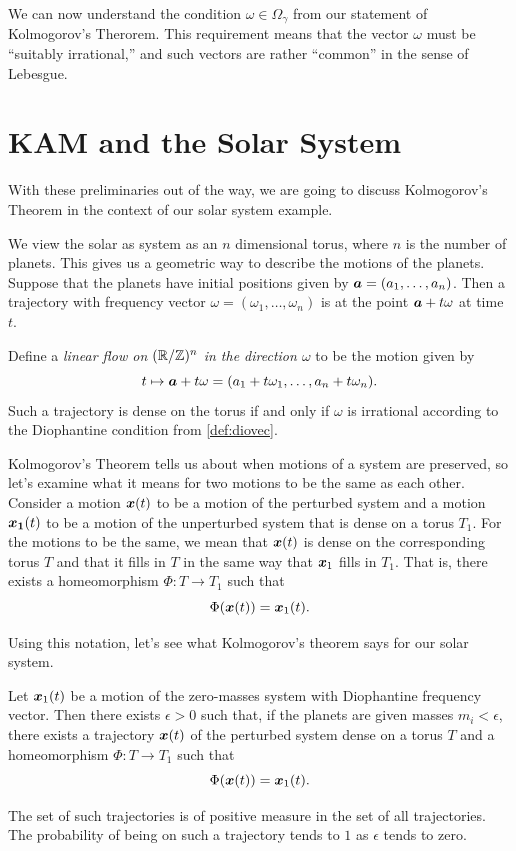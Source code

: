 \documentclass[twoside,letterpaper,11pt]{article}
\numberwithin{equation}{section}
\begin{document}
We can now understand the condition $\omega \in \Omega_{\gamma}$ from our
statement of Kolmogorov's Therorem.
This requirement means that the vector $\omega$ must be ``suitably irrational,''
and such vectors are rather ``common'' in the sense of Lebesgue.

\section{KAM and the Solar System}
\label{sec:kam-solar-system}

With these preliminaries out of the way, we are going to discuss Kolmogorov's
Theorem in the context of our solar system example.

We view the solar as system as an $n$ dimensional torus, where $n$ is the number
of planets.
This gives us a geometric way to describe the motions of the planets.
Suppose that the planets have initial positions given by $\bm{a} = (a_1, \ldots,
a_n)$.
Then a trajectory with frequency vector $\omega = (\omega_1, \ldots, \omega_n)$
is at the point $\bm{a} + t \omega$ at time $t$.

Define a \emph{linear flow on $(\mathbb{R}/\mathbb{Z})^n$ in the direction $\omega$} to be the
motion given by
\begin{equation*}
  t \mapsto \bm{a} + t \omega = (a_1 + t \omega_1, \ldots, a_n + t \omega_n).
\end{equation*}
Such a trajectory is dense on the torus if and only if $\omega$ is irrational
according to the Diophantine condition from \cref{def:diovec}.

Kolmogorov's Theorem tells us about when motions of a system are preserved, so
let's examine what it means for two motions to be the same as each other.
Consider a motion $\bm{x}(t)$ to be a motion of the perturbed system and a
motion $\bm{x_1}(t)$ to be a motion of the unperturbed system that is dense on a
torus $T_1$.
For the motions to be the same, we mean that $\bm{x}(t)$ is dense on the
corresponding torus $T$ and that it fills in $T$ in the same way that $\bm{x}_1$
fills in $T_1$.
That is, there exists a homeomorphism $\Phi : T \to T_1$ such that
\begin{equation*}
  \Phi(\bm{x}(t)) = \bm{x}_1(t).
\end{equation*}

Using this notation, let's see what Kolmogorov's theorem says for our solar
system.
\begin{thm}
  Let $\bm{x}_1(t)$ be a motion of the zero-masses system with Diophantine
  frequency vector.
  Then there exists $\epsilon > 0$ such that, if the planets are given masses
  $m_i < \epsilon$, there exists a trajectory $\bm{x}(t)$ of the perturbed
  system dense on a torus $T$ and a homeomorphism $\Phi : T \to T_1$ such that
  \begin{equation*}
    \Phi(\bm{x}(t)) = \bm{x}_1(t).
  \end{equation*}

  The set of such trajectories is of positive measure in the set of all
  trajectories.
  The probability of being on such a trajectory tends to $1$ as $\epsilon$ tends
  to zero.
\end{thm}
\end{document}
